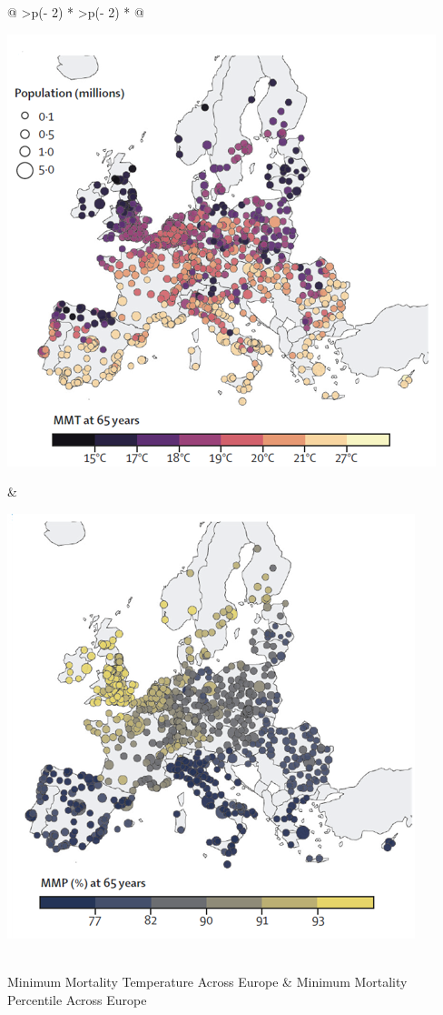 \documentclass[
]{krantz}
\begin{document}
\begin{longtable}[]{@{}
  >{\centering\arraybackslash}p{(\columnwidth - 2\tabcolsep) * }
  >{\centering\arraybackslash}p{(\columnwidth - 2\tabcolsep) * }@{}}
\toprule\noalign{}
\begin{minipage}[b]{\linewidth}\centering
\includegraphics{work/09-epidemiologic/figures/Bild5.png}
\end{minipage} & \begin{minipage}[b]{\linewidth}\centering
\includegraphics{work/09-epidemiologic/figures/Bild6.png}
\end{minipage} \\
\midrule\noalign{}
\endhead
\bottomrule\noalign{}
\endlastfoot
Minimum Mortality Temperature Across Europe & Minimum Mortality Percentile Across Europe \\
\end{longtable}
\end{document}
